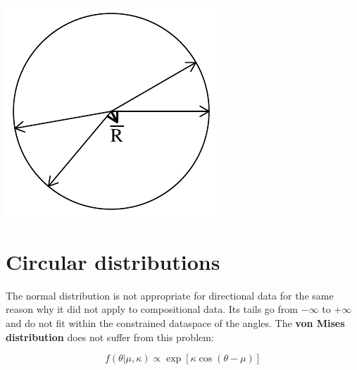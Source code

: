 \noindent\begin{minipage}[t][][b]{.2\textwidth}
\includegraphics[width=\textwidth]{../figures/lowconcentration.pdf}\\
\end{minipage}
\begin{minipage}[t][][t]{.8\textwidth}
  \label{fig:lowconcentration}
\end{minipage}

\section{Circular distributions}
\label{sec:circular-distributions}

The normal distribution is not appropriate for directional data for
the same reason why it did not apply to compositional data. Its tails
go from $-\infty$ to $+\infty$ and do not fit within the constrained
dataspace of the angles. The \textbf{von Mises distribution} does not
suffer from this problem:

\begin{equation}
  f(\theta|\mu,\kappa) \propto \exp[\kappa \cos(\theta-\mu)]
  \label{eq:vonMises}
\end{equation}

